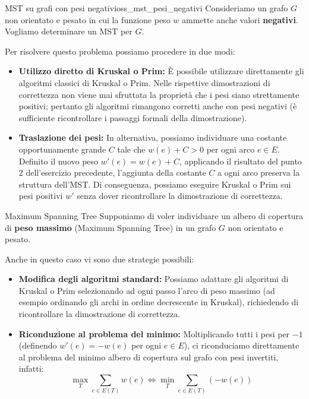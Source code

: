 \documentclass[12pt]{report}
\begin{document}
	\begin{osservazione}{MST su grafi con pesi negativi}{oss_mst_pesi_negativi}
		Consideriamo un grafo $G$ non orientato e pesato in cui la funzione peso $w$ ammette anche valori \textbf{negativi}. Vogliamo determinare un MST per $G$.
		
		Per risolvere questo problema possiamo procedere in due modi:
		\begin{itemize}
			\item \textbf{Utilizzo diretto di Kruskal o Prim:} È possibile utilizzare direttamente gli algoritmi classici di Kruskal o Prim. Nelle rispettive dimostrazioni di correttezza non viene mai sfruttata la proprietà che i pesi siano strettamente positivi; pertanto gli algoritmi rimangono corretti anche con pesi negativi (è sufficiente ricontrollare i passaggi formali della dimostrazione).
			
			\item \textbf{Traslazione dei pesi:} In alternativa, possiamo individuare una costante opportunamente grande $C$ tale che $w(e) + C > 0$ per ogni arco $e \in E$. Definito il nuovo peso $w'(e) = w(e) + C$, applicando il risultato del punto 2 dell'esercizio precedente, l'aggiunta della costante $C$ a ogni arco preserva la struttura dell'MST. Di conseguenza, possiamo eseguire Kruskal o Prim sui pesi positivi $w'$ senza dover ricontrollare la dimostrazione di correttezza.
		\end{itemize}
	\end{osservazione}
	
	\begin{esercizio}{Maximum Spanning Tree}{}
		Supponiamo di voler individuare un albero di copertura di \textbf{peso massimo} (Maximum Spanning Tree) in un grafo $G$ non orientato e pesato.
		
		Anche in questo caso vi sono due strategie possibili:
		\begin{itemize}
			\item \textbf{Modifica degli algoritmi standard:} Possiamo adattare gli algoritmi di Kruskal o Prim selezionando ad ogni passo l'arco di peso massimo (ad esempio ordinando gli archi in ordine decrescente in Kruskal), richiedendo di ricontrollare la dimostrazione di correttezza.
			
			\item \textbf{Riconduzione al problema del minimo:} Moltiplicando tutti i pesi per $-1$ (definendo $w'(e) = -w(e)$ per ogni $e \in E$), ci riconduciamo direttamente al problema del minimo albero di copertura sul grafo con pesi invertiti, infatti:
			\[
			\max_{T} \sum_{e \in E(T)} w(e) \iff \min_{T} \sum_{e \in E(T)} (-w(e))
			\]
		\end{itemize}
	\end{esercizio}
	
\end{document}
